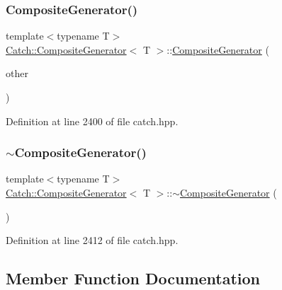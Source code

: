 \subsubsection{\texorpdfstring{Composite\+Generator()}{CompositeGenerator()}\hspace{0.1cm}{\footnotesize\ttfamily [2/2]}}
{\footnotesize\ttfamily template$<$typename T$>$ \\
\hyperlink{class_catch_1_1_composite_generator}{Catch\+::\+Composite\+Generator}$<$ T $>$\+::\hyperlink{class_catch_1_1_composite_generator}{Composite\+Generator} (\begin{DoxyParamCaption}\item[{\hyperlink{class_catch_1_1_composite_generator}{Composite\+Generator}$<$ T $>$ \&}]{other }\end{DoxyParamCaption})\hspace{0.3cm}{\ttfamily [inline]}}



Definition at line 2400 of file catch.\+hpp.

\hypertarget{class_catch_1_1_composite_generator_a5766205abd7004c508c20ddbb5e5555e}{}\label{class_catch_1_1_composite_generator_a5766205abd7004c508c20ddbb5e5555e} 
\subsubsection{\texorpdfstring{$\sim$\+Composite\+Generator()}{~CompositeGenerator()}}
{\footnotesize\ttfamily template$<$typename T$>$ \\
\hyperlink{class_catch_1_1_composite_generator}{Catch\+::\+Composite\+Generator}$<$ T $>$\+::$\sim$\hyperlink{class_catch_1_1_composite_generator}{Composite\+Generator} (\begin{DoxyParamCaption}{ }\end{DoxyParamCaption})\hspace{0.3cm}{\ttfamily [inline]}}



Definition at line 2412 of file catch.\+hpp.



\subsection{Member Function Documentation}
\hypertarget{class_catch_1_1_composite_generator_af3774d42ad2d3453d089ca599efe0517}{}\label{class_catch_1_1_composite_generator_af3774d42ad2d3453d089ca599efe0517} 

